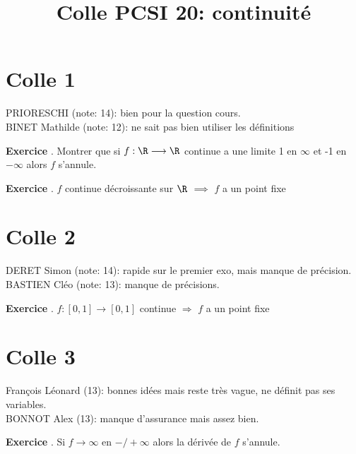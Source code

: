 \documentclass[10pt,a4paper]{article}
\title{Colle PCSI 20: continuité}
\newcounter{question}
\newcounter{exo}
\newenvironment{exo}{\vspace{0.5cm}\setcounter{question}{0}\addtocounter{exo}{1} \noindent \textbf{Exercice \theexo}. \normalsize }{\par}
\begin{document}
	\maketitle
\section*{Colle 1}
\setcounter{exo}{0}
	PRIORESCHI (note: 14): bien pour la question cours.\\
	BINET Mathilde (note: 12): ne sait pas bien utiliser les définitions\\
		
	\begin{exo}
		Montrer que si $f : \R \longrightarrow \R$ continue a une limite 1 en $\infty$ et -1 en $-\infty$ alors $f$ s'annule.
 	\end{exo}

	\begin{exo}
		$f$ continue décroissante sur $\R$ $\implies$ $f$ a un point fixe
	\end{exo}
	
	\section*{Colle 2}
	DERET Simon (note: 14): rapide sur le premier exo, mais manque de précision.\\
	BASTIEN Cléo (note: 13): manque de précisions.\\
	
	\begin{exo}
		$f : [0, 1] \rightarrow [0, 1]$ continue $\Longrightarrow$ $f$ a un point fixe
	\end{exo}

	\section*{Colle 3}
	\setcounter{exo}{0}
	François Léonard (13): bonnes idées mais reste très vague, ne définit pas ses variables.\\
	BONNOT Alex (13): manque d'assurance mais assez bien.\\
	
	\begin{exo}
		Si $f \longrightarrow \infty$ en $-/+ \infty$ alors la dérivée de $f$ s'annule.
	\end{exo}
	
\end{document}
